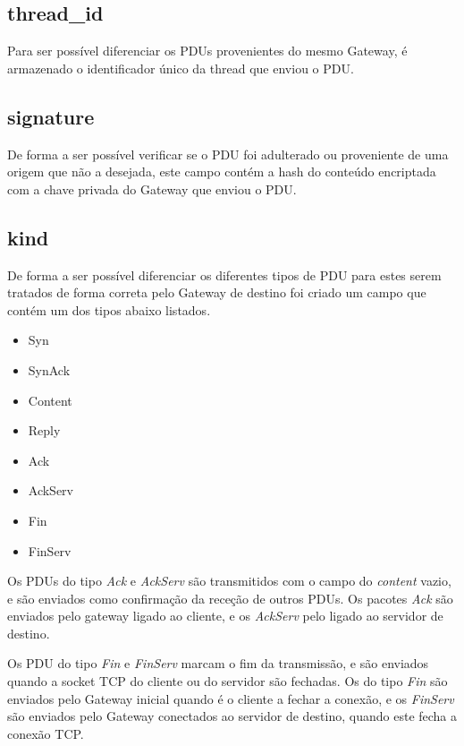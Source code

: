 \documentclass[a4paper]{report}
\begin{document}
\subsection{thread\_id}

Para ser possível diferenciar os PDUs provenientes do mesmo Gateway,
é armazenado o identificador único da thread que enviou o PDU.

\subsection{signature}

De forma a ser possível verificar se o PDU foi adulterado ou proveniente
de uma origem que não a desejada, este campo contém a hash do conteúdo
encriptada com a chave privada do Gateway que enviou o PDU.

\subsection{kind} \label{subs:kind}

De forma a ser possível diferenciar os diferentes tipos de PDU para estes serem
tratados de forma correta pelo Gateway de destino foi criado um campo que contém
um dos tipos abaixo listados.

\begin{itemize}
        \item Syn
        \item SynAck
        \item Content
        \item Reply
        \item Ack
        \item AckServ
        \item Fin
        \item FinServ
\end{itemize}

Os PDUs do tipo \textit{Ack} e \textit{AckServ} são transmitidos com o 
campo do \textit{content} vazio, e são enviados como confirmação da 
receção de outros PDUs. Os pacotes \textit{Ack} são enviados pelo gateway ligado
ao cliente, e os \textit{AckServ} pelo ligado ao servidor de destino.

Os PDU do tipo \textit{Fin} e \textit{FinServ} marcam o fim da transmissão,
e são enviados quando a socket TCP do cliente ou do servidor são fechadas.
Os do tipo \textit{Fin} são enviados pelo Gateway inicial quando é o 
cliente a fechar a conexão, e os \textit{FinServ} são enviados pelo Gateway
conectados ao servidor de destino, quando este fecha a conexão TCP.
\end{document}
